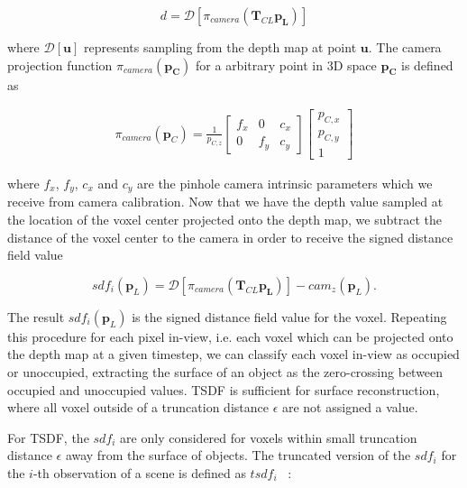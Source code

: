 \begin{equation}
    d = \mathcal{D} \left[ \pi_{camera} \left( \boldsymbol{T}_{CL} \boldsymbol{p_L}  \right) \right]
\end{equation}

where $\mathcal{D} \left[ \boldsymbol{u} \right]$ represents sampling from the depth map at point $\boldsymbol{u}$. The camera projection function $\pi_{camera} \left( \boldsymbol{p_C} \right)$ for a arbitrary point in 3D space $\boldsymbol{p_C}$ is defined as 

\begin{gather}
    \pi_{camera} (\boldsymbol{p}_C) = \frac{1}{ p_{C,z} } 
    \begin{bmatrix}
        f_x& 0& c_x \\
        0& f_y& c_y
    \end{bmatrix}
    \begin{bmatrix}
        p_{C,x} \\ p_{C,y}\\ 1
    \end{bmatrix} 
\end{gather}

where $f_x$, $f_y$, $c_x$ and $c_y$ are the pinhole camera intrinsic parameters which we receive from camera calibration. Now that we have the depth value sampled at the location of the voxel center projected onto the depth map, we subtract the distance of the voxel center to the camera in order to receive the signed distance field value

\begin{equation}
    sdf_i(\boldsymbol{p}_L) = \mathcal{D} \left[ \pi_{camera} \left( \boldsymbol{T}_{CL} \boldsymbol{p_L}  \right) \right] - cam_z( \boldsymbol{p}_L ).
\end{equation}

The result $sdf_i(\boldsymbol{p}_L)$ is the signed distance field value for the voxel. Repeating this procedure for each pixel in-view, i.e. each voxel which can be projected onto the depth map at a given timestep, we can classify each voxel in-view as occupied or unoccupied, extracting the surface of an object as the zero-crossing between occupied and unoccupied values. TSDF is sufficient for surface reconstruction, where all voxel outside of a truncation distance $\epsilon$ are not assigned a value. 

For TSDF, the $sdf_i$ are only considered for voxels within small truncation distance $\epsilon$ away from the surface of objects. The truncated version of the $ sdf_i $ for the $i$-th observation of a scene is defined as $ tsdf_i $ ~\cite{Werner2014}:

